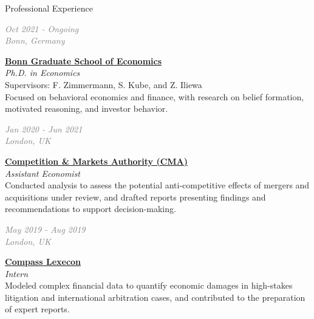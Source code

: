 \documentclass{resume} %
\newcommand{\cventry}[2]{%
  \noindent
  \begin{minipage}[t]{0.24\linewidth}
    \raggedright\textcolor{gray}{\emph{#1}}
  \end{minipage}%
  \hspace{0.02\linewidth}%
  \begin{minipage}[t]{0.73\linewidth}
    \raggedright #2
  \end{minipage}
  \par\medskip
}
\newcommand{\cvtitle}[1]{\textbf{#1}}
\newcommand{\cvrole}[1]{\emph{#1}}
\newcommand{\cvdesc}[1]{{\small\color{gray}#1}}
\begin{document}

\begin{rSection}{Professional Experience}

    
\cventry{Oct 2021 - Ongoing \\ Bonn, Germany}%
        {\cvtitle{\href{https://www.econ.uni-bonn.de/bgse/en}{Bonn Graduate School of Economics}} \\
        {\cvrole{Ph.D. in Economics}} \\[2pt]
        {\cvdesc{Supervisors: F. Zimmermann, S. Kube, and Z. Iliewa\\
        Focused on behavioral economics and finance, with research on belief formation, motivated reasoning, and investor behavior.}}}

\cventry{Jan 2020 - Jun 2021 \\ London, UK}%
        {\cvtitle{\href{https://www.gov.uk/government/organisations/competition-and-markets-authority}{Competition \& Markets Authority (CMA)}} \\
        {\cvrole{Assistant Economist}} \\[2pt]
        {\cvdesc{Conducted analysis to assess the potential anti-competitive effects of mergers and acquisitions under review, and drafted reports presenting findings and recommendations to support decision-making.}}}

\cventry{May 2019 - Aug 2019 \\ London, UK}%
        {\cvtitle{\href{https://www.compasslexecon.com}{Compass Lexecon}} \\
        {\cvrole{Intern}} \\[2pt]
        {\cvdesc{Modeled complex financial data to quantify economic damages in high-stakes litigation and international arbitration cases, and contributed to the preparation of expert reports.}}}
       
\end{rSection}

\end{document}
